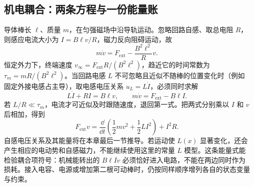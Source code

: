 \subsection{机电耦合：两条方程与一份能量账}
导体棒长 $\ell$、质量 $m$，在匀强磁场中沿导轨运动。忽略回路自感、取总电阻 $R$，则感应电流大小为 $I=B\ell v/R$，磁力反向阻碍运动，故
\[
 m\dot v=F_{\mathrm{ext}}-\frac{B^2\ell^2}{R}v.
\]
恒定外力下，终端速度 $v_\infty=F_{\mathrm{ext}}R/(B^2\ell^2)$，趋近它的时间常数为 $\tau_m=mR/(B^2\ell^2)$。当回路电感 $L$ 不可忽略且近似不随棒的位置变化时（例如固定外接电感占主导），取电感电压关系 $u_L=L\dot I$，必须同时求解
\[
 L\dot I+RI=B\ell v,\qquad m\dot v=F_{\mathrm{ext}}-B\ell I.
\]
若 $L/R\ll\tau_m$，电流才可近似及时跟随速度，退回第一式。把两式分别乘以 $I$ 和 $v$ 后相加，得到
\[
 F_{\mathrm{ext}}v=\frac{\dd}{\dd t}\left(\frac12mv^2+\frac12LI^2\right)+I^2R.
\]
自感电压关系及其能量将在本章最后一节推导。若运动使 $L(x)$ 显著变化，还会产生相应的电动势和自感磁力，不能继续使用这里的常量 $L$ 模型。这条能量式能检验耦合项符号：机械能转出的 $B\ell Iv$ 必须恰好进入电路，不能在两边同时作为损耗。接入电容、电源或增加第二根可动棒时，仍按同样顺序增列各自的状态变量与约束。

